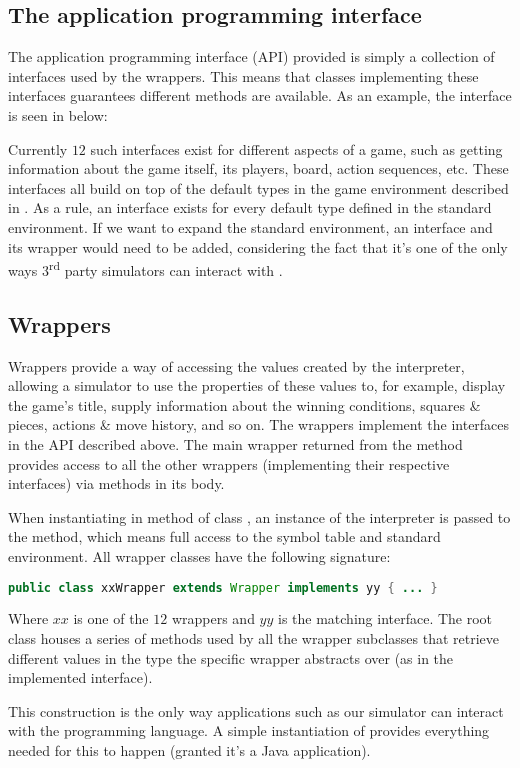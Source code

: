 \subsection{The application programming interface}
The application programming interface (API) provided is simply a collection of interfaces used by the wrappers. This means that classes implementing these interfaces guarantees different methods are available. As an example, the  interface is seen in  below:



Currently $12$ such interfaces exist for different aspects of a game,
such as getting information about the game itself, its players, board,
action sequences, etc. These interfaces all build on top of the default
types in the game environment described in . As a
rule, an interface exists for every default type defined in the standard
environment. If we want to expand the standard environment, an interface
and its wrapper would need to be added, considering the fact that it's
one of the only ways 3\textsuperscript{rd} party simulators can interact
with \productname{}.

\subsection{Wrappers}
Wrappers provide a way of accessing the values created by the
interpreter, allowing a simulator to use the properties of these
values to, for example, display the game's title, supply information
about the winning conditions, squares \& pieces, actions \& move
history, and so on. The wrappers implement the interfaces in the
API described above. The main wrapper returned from the method
 provides access to all the other wrappers
(implementing their respective interfaces) via methods in its body.

When instantiating  in method 
of class , an instance of the interpreter
is passed to the method, which means full access to the symbol table and
standard environment. All wrapper classes have the following signature:

\begin{lstlisting}[language=Java,caption={\emph{The signaure of all API wrapper classes.}}]
  public class xxWrapper extends Wrapper implements yy { ... }
\end{lstlisting}

Where $xx$ is one of the $12$ wrappers and $yy$ is the matching
interface. The root class  houses a series of methods
used by all the wrapper subclasses that retrieve different values in
the type the specific wrapper abstracts over (as in the implemented
interface).

This construction is the only way applications such as our simulator
can interact with the programming language. A simple instantiation of
 provides everything needed for this to
happen (granted it's a Java application).
